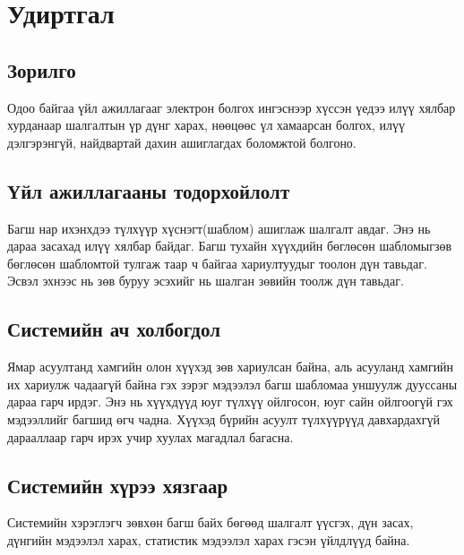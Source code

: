 
\section{Удиртгал}

    \subsection{Зорилго}
		Одоо байгаа үйл ажиллагааг электрон болгох ингэснээр хүссэн үедээ илүү хялбар хурданаар шалгалтын үр дүнг харах, нөөцөөс үл хамаарсан болгох, илүү дэлгэрэнгүй, найдвартай дахин ашиглагдах боломжтой болгоно.
    \subsection{Үйл ажиллагааны тодорхойлолт}
		Багш нар ихэнхдээ түлхүүр хүснэгт(шаблом) ашиглаж шалгалт авдаг. Энэ нь дараа засахад илүү хялбар байдаг. Багш тухайн хүүхдийн бөглөсөн шабломыгзөв бөглөсөн шабломтой тулгаж таар ч байгаа хариултуудыг тоолон дүн тавьдаг. Эсвэл эхнээс нь зөв буруу эсэхийг нь шалган зөвийн тоолж дүн тавьдаг.
    \subsection{Системийн ач холбогдол}
		Ямар асуултанд хамгийн олон хүүхэд зөв хариулсан байна, аль асууланд хамгийн их хариулж чадаагүй байна гэх зэрэг мэдээлэл багш шабломаа уншуулж дууссаны дараа гарч ирдэг. Энэ нь хүүхдүүд юуг түлхүү ойлгосон, юуг сайн ойлгоогүй гэх мэдээллийг багшид өгч чадна. Хүүхэд бүрийн асуулт түлхүүрүүд давхардахгүй дарааллаар гарч ирэх учир хуулах магадлал багасна.
	\subsection{Системийн хүрээ хязгаар}
	Системийн хэрэглэгч зөвхөн багш байх бөгөөд шалгалт үүсгэх, дүн засах, дүнгийн мэдээлэл харах, статистик мэдээлэл харах гэсэн үйлдлүүд байна.